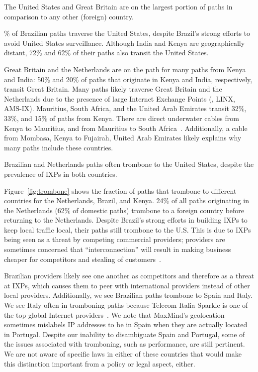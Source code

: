 \begin{finding}
The United States and Great Britain are on the largest portion of paths in comparison to any other (foreign) country.
\end{finding}
\% of Brazilian paths traverse the United States, despite Brazil's
strong efforts to avoid United States surveillance.  Although India and
Kenya are geographically distant, 72\% and 62\% of their paths also transit
the United States.

Great Britain and the Netherlands are on the path for 
many paths from Kenya and India:
50\% and 20\% of
paths that originate in Kenya and India, respectively, transit Great
Britain.   Many paths likely traverse Great Britain and the Netherlands due to
the presence of large Internet Exchange Points (\ie, LINX, AMS-IX).
Mauritius, South Africa, and the United Arab Emirates transit 32\%,
33\%, and 15\% of paths from Kenya.  There are direct underwater cables
from Kenya to Mauritius, and from Mauritius to South
Africa~\cite{cablemap}.  Additionally, a cable from Mombasa,
Kenya to Fujairah, United Arab Emirates likely explains why many
paths include these countries. 



\begin{finding}
Brazilian and Netherlands paths often trombone to the United States, despite the prevalence of IXPs in both countries.
\end{finding}
\noindent
Figure~\ref{fig:trombone}
shows the fraction of paths that trombone to
different countries for the Netherlands, Brazil, and Kenya. 24\% of
all paths originating in the Netherlands (62\% of domestic paths)
trombone to a foreign country before returning to the
Netherlands. Despite Brazil's strong efforts in building IXPs to keep
local traffic local, 
their paths still trombone to the U.S.  This is due to IXPs being seen
as a threat by competing commercial providers; providers are sometimes
concerned that ``interconnection'' will result in making business
cheaper for competitors and stealing of customers~\cite{ixp_policy}.

Brazilian providers likely see one another as competitors and therefore as a
threat at IXPs, which causes them to peer with international providers instead
of other local providers.  Additionally, we see Brazilian paths trombone to
Spain and Italy.  We see Italy often in tromboning paths because Telecom
Italia Sparkle is one of the top global Internet providers~\cite{bakers}. We
note that MaxMind's geolocation sometimes mislabels IP addresses to be in
Spain when they are actually located in Portugal.  Despite our inability to
disambiguate Spain and Portugal, some of the issues associated with tromboning,
such as performance, are still pertinent. We are not aware of specific laws in
either of these countries that would make this distinction important from a
policy or legal aspect, either.

